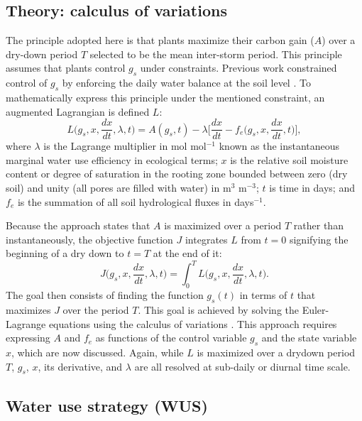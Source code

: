 \documentclass[utf8]{frontiersSCNS} %
\begin{document}
\subsection{Theory: calculus of variations}

The principle adopted here is that plants maximize their carbon gain ($A$) over a dry-down period $T$ selected to be the mean inter-storm period. This principle assumes that plants control $g_s$ under constraints. Previous work constrained control of $g_s$ by enforcing the daily water balance at the soil level \citep{manzoni_optimization_2013}. To mathematically express this principle under the mentioned constraint, an augmented Lagrangian is defined $L$:
\begin{equation}
    \label{eqn:Lagrangian}
    L\Big(g_s, x, \frac{dx}{dt}, \lambda, t\Big) = A(g_s, t) - \lambda \Bigg[ \frac{dx}{dt} - f_e\Big(g_s, x, \frac{dx}{dt}, t\Big)\Bigg],
\end{equation}
where $\lambda$ is the Lagrange multiplier in mol mol$^{-1}$ known as the instantaneous marginal water use efficiency in ecological terms; $x$ is the relative soil moisture content or degree of saturation in the rooting zone bounded between zero (dry soil) and unity (all pores are filled with water) in m$^3$ m$^{-3}$; $t$ is time in days; and $f_e$ is the summation of all soil hydrological fluxes in days$^{-1}$.

Because the approach states that $A$ is maximized over a period $T$ rather than instantaneously, the objective function $J$ integrates $L$ from $t=0$ signifying the beginning of a dry down to $t=T$ at the end of it:
\begin{equation}
    \label{eqn:Objective}
    J\Big(g_s, x, \frac{dx}{dt}, \lambda, t\Big) = \int_0^T L\Big(g_s, x, \frac{dx}{dt}, \lambda, t\Big).
\end{equation}
The goal then consists of finding the function $g_s(t)$ in terms of $t$ that maximizes $J$ over the period $T$. This goal is achieved by solving the Euler-Lagrange equations using the calculus of variations \citep{witelski_variational_2015}. This approach requires expressing $A$ and $f_e$ as functions of the control variable $g_s$ and the state variable $x$, which are now discussed. Again, while $L$ is maximized over a drydown period $T$, $g_s$, $x$, its derivative, and $\lambda$ are all resolved at sub-daily or diurnal time scale.

\subsection{Water use strategy (WUS)}
\end{document}
